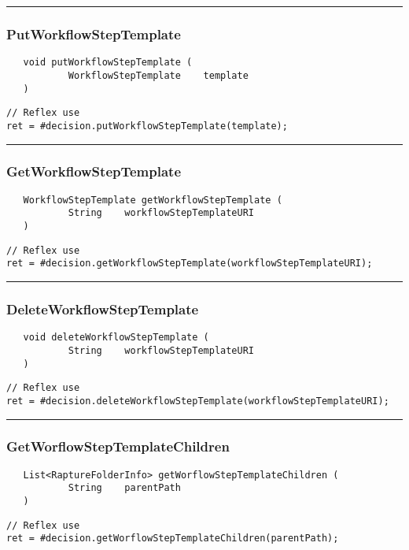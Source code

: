 \rule{15cm}{2pt}
\subsubsection{PutWorkflowStepTemplate}
\label{Api:PutWorkflowStepTemplate}
\begin{verbatim}
   void putWorkflowStepTemplate (
           WorkflowStepTemplate    template
   )
\end{verbatim}
\begin{lstlisting}[language=reflex]
// Reflex use
ret = #decision.putWorkflowStepTemplate(template);
\end{lstlisting}



\rule{15cm}{2pt}
\subsubsection{GetWorkflowStepTemplate}
\label{Api:GetWorkflowStepTemplate}
\begin{verbatim}
   WorkflowStepTemplate getWorkflowStepTemplate (
           String    workflowStepTemplateURI
   )
\end{verbatim}
\begin{lstlisting}[language=reflex]
// Reflex use
ret = #decision.getWorkflowStepTemplate(workflowStepTemplateURI);
\end{lstlisting}



\rule{15cm}{2pt}
\subsubsection{DeleteWorkflowStepTemplate}
\label{Api:DeleteWorkflowStepTemplate}
\begin{verbatim}
   void deleteWorkflowStepTemplate (
           String    workflowStepTemplateURI
   )
\end{verbatim}
\begin{lstlisting}[language=reflex]
// Reflex use
ret = #decision.deleteWorkflowStepTemplate(workflowStepTemplateURI);
\end{lstlisting}



\rule{15cm}{2pt}
\subsubsection{GetWorflowStepTemplateChildren}
\label{Api:GetWorflowStepTemplateChildren}
\begin{verbatim}
   List<RaptureFolderInfo> getWorflowStepTemplateChildren (
           String    parentPath
   )
\end{verbatim}
\begin{lstlisting}[language=reflex]
// Reflex use
ret = #decision.getWorflowStepTemplateChildren(parentPath);
\end{lstlisting}



